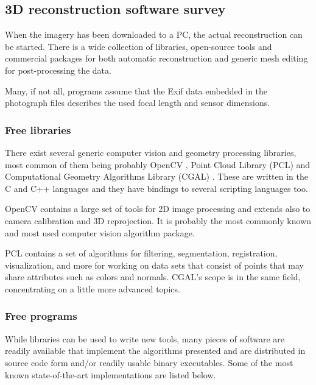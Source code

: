 
\subsection{3D reconstruction software survey} %


When the imagery has been downloaded to a PC, the actual reconstruction can be started.
There is a wide collection of libraries, open-source tools and commercial packages for both automatic reconstruction and generic mesh editing for post-processing the data.

Many, if not all, programs assume that the Exif data embedded in the photograph files describes the used focal length and sensor dimensions.


\subsubsection{Free libraries} %

There exist several generic computer vision and geometry processing libraries, most common of them being probably OpenCV \cite{opencv}, Point Cloud Library (PCL) \cite{pcl} and Computational Geometry Algorithms Library (CGAL) \cite{cgal}. These are written in the C and C++ languages and they have bindings to several scripting languages too.

OpenCV contains a large set of tools for 2D image processing and extends also to camera calibration and 3D reprojection.
It is probably the most commonly known and most used computer vision algorithm package.

PCL contains a set of algorithms for filtering, segmentation, registration, visualization, and more for working on data sets that consist of points that may share attributes such as colors and normals. CGAL's scope is in the same field, concentrating on a little more advanced topics.


\subsubsection{Free programs} %

While libraries can be used to write new tools, many pieces of software are readily available that implement the algorithms presented and are distributed in source code form and/or readily usable binary executables.
Some of the most known state-of-the-art implementations are listed below.


